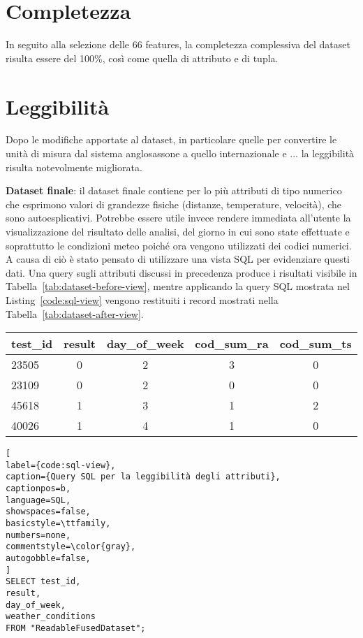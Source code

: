 \section{Completezza}
In seguito alla selezione delle 66 features, la completezza complessiva del 
dataset risulta essere del 100\%, così come quella di attributo e di tupla.

\section{Leggibilità}
Dopo le modifiche apportate al dataset, in particolare quelle per convertire le 
unità di misura dal sistema anglosassone a quello internazionale e ... la 
leggibilità risulta notevolmente migliorata.

\item \textbf{Dataset finale}: il dataset finale contiene per lo più 
attributi di tipo numerico che esprimono valori di grandezze fisiche 
(distanze, temperature, velocità), che sono autoesplicativi. Potrebbe 
essere utile invece rendere immediata all'utente la visualizzazione del 
risultato delle analisi, del giorno in cui sono state effettuate e 
soprattutto le condizioni meteo poiché ora vengono utilizzati dei codici 
numerici. A causa di ciò è stato pensato di utilizzare una vista SQL per 
evidenziare questi dati. Una query sugli attributi discussi in precedenza 
produce i risultati visibile in Tabella~\ref{tab:dataset-before-view}, 
mentre applicando la query SQL mostrata nel Listing~\ref{code:sql-view} 
vengono restituiti i record mostrati nella 
Tabella~\ref{tab:dataset-after-view}.

\vspace{.5em}
\begin{centering}
	\begin{tabular}{lcccc}
		\toprule
		test\_id & result & day\_of\_week & cod\_sum\_ra & cod\_sum\_ts \\
		\midrule
		23505 & 0 & 2 & 3 & 0 \\
		23109 &	0 & 2 & 0 & 0 \\
		45618 &	1 & 3 & 1 & 2 \\
		40026 &	1 & 4 & 1 & 0 \\
		\bottomrule
	\end{tabular}
	\label{tab:dataset-before-view}
\end{centering}

\begin{lstlisting}[
label={code:sql-view},
caption={Query SQL per la leggibilità degli attributi},
captionpos=b,
language=SQL,
showspaces=false,
basicstyle=\ttfamily,
numbers=none,
commentstyle=\color{gray},
autogobble=false,
]
SELECT test_id, 
result, 
day_of_week, 
weather_conditions
FROM "ReadableFusedDataset";
\end{lstlisting}


